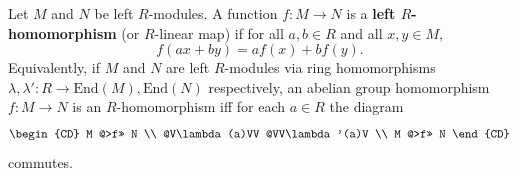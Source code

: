 Let $M$ and $N$ be left $R$-modules. A function $f: M \to N$ is a \textbf{left $R$-homomorphism} (or $R$-linear map) if for all $a, b \in R$ and all $x, y \in M$,
$$f(ax + by) = af(x) + bf(y).$$
Equivalently, if $M$ and $N$ are left $R$-modules via ring homomorphisms $\lambda, \lambda': R \to \text{End}(M), \text{End}(N)$ respectively, an abelian group homomorphism $f: M \to N$ is an $R$-homomorphism iff for each $a \in R$ the diagram
$$\begin{CD}
M @>f>> N \\
@V\lambda(a)VV @VV\lambda'(a)V \\
M @>f>> N
\end{CD}$$
commutes.
